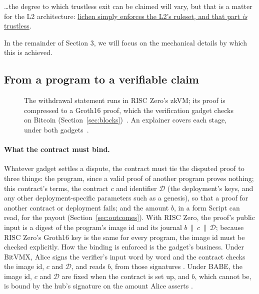 \documentclass[11pt]{article}
\begin{document}
\ldots the degree to which trustless exit can be claimed will vary, but that is a matter for the L2 architecture: \underline{lichen simply enforces the L2's ruleset, and that part \emph{is} trustless}.

In the remainder of Section 3, we will focus on the mechanical details by which this is achieved.

\subsection{From a program to a verifiable claim}

\begin{figure}[H]
\centering
{}
\caption{The withdrawal statement runs in RISC Zero's zkVM; its proof is
compressed to a Groth16 proof, which the verification gadget checks on
Bitcoin (Section~\ref{sec:blocks})~\cite{risc0}. An explainer covers each
stage, under both gadgets~\cite{pipeline}.}
\end{figure}

\paragraph{What the contract must bind.} Whatever gadget settles a
dispute, the contract must tie the disputed proof to three things: the
program, since a valid proof of another program proves nothing; this
contract's terms, the contract $c$ and identifier $\mathcal{D}$ (the deployment's keys, and any other deployment-specific parameters such as a genesis), so that a proof for another contract or deployment fails; and the amount $b$, in a
form Script can read, for the payout (Section~\ref{sec:outcomes}). With
RISC Zero, the proof's public input is a digest of the program's image id
and its journal $b \,\|\, c \,\|\, \mathcal{D}$; because RISC Zero's Groth16 key is
the same for every program, the image id must be checked explicitly. How the binding is enforced is the gadget's business. Under BitVMX,
Alice signs the verifier's input word by word and the contract checks the
image id, $c$ and $\mathcal{D}$, and reads $b$, from those signatures
\cite[\S 2]{lichenbitvmx}. Under BABE, the image id, $c$ and $\mathcal{D}$ are fixed
when the contract is set up, and $b$, which cannot be, is bound by the
hub's signature on the amount Alice asserts \cite[\S 5]{lichenbuilt}.
\end{document}
